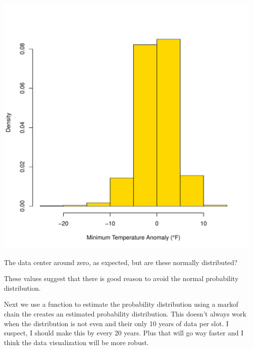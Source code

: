 \documentclass{article}\usepackage[]{graphicx}\usepackage[]{color}
\makeatletter
\def\maxwidth{ %
  \ifdim\Gin@nat@width>\linewidth
    \linewidth
  \else
    \Gin@nat@width
  \fi
}
\newenvironment{knitrout}{}{} %
\makeatother
\begin{document}
\begin{knitrout}
\color{fgcolor}
\includegraphics[width=\maxwidth]{figure/unnamed-chunk-16-1} 
\end{knitrout}

The data center around zero, as expected, but are these normally distributed? 




These values suggest that there is good reason to avoid  the normal probability distribution. 

Next we use a function to estimate the probability distribution using a markof chain the creates an estimated probability distribution. This doesn't always work when the distribution is not even and their only 10 years of data per slot. I suspect, I should make this by every 20 years. Plus that will go way faster and I think the data visualization will be more robust. 
\end{document}
